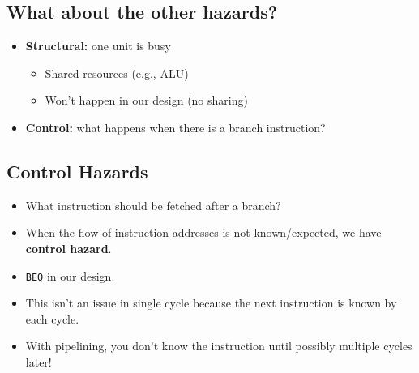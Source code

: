 \documentclass[10pt]{article}
\begin{document}
\subsection*{What about the other hazards?}
\begin{itemize}
    \item \textbf{Structural:} one unit is busy
    \begin{itemize}
        \item Shared resources (e.g., ALU)
        \item Won't happen in our design (no sharing)
    \end{itemize}
    \item \textbf{Control:} what happens when there is a branch instruction?
\end{itemize}

\subsection*{Control Hazards}
\begin{itemize}
    \item What instruction should be fetched after a branch?
    \item When the flow of instruction addresses is not known/expected, we have \textbf{control hazard}.
    \item \texttt{BEQ} in our design.
    \item This isn't an issue in single cycle because the next instruction is known by each cycle.
    \item With pipelining, you don't know the instruction until possibly multiple cycles later!
\end{itemize}
\end{document}
